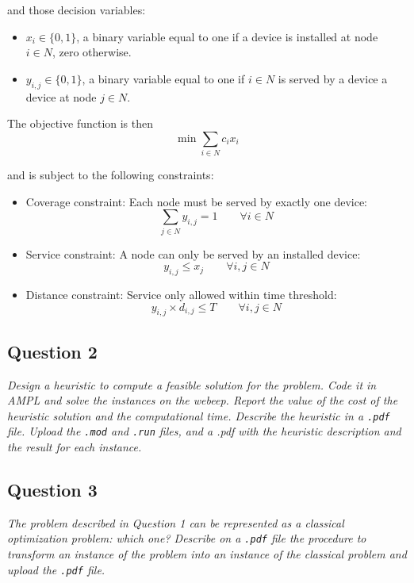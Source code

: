 \documentclass[10pt]{article}
\begin{document}
    and those decision variables:
    \begin{itemize}
        \item $x_i \in \{0,1\}$, a binary variable equal to one if a device is installed at node $i \in N$, zero otherwise.
        \item $y_{i,j} \in \{0,1\}$, a binary variable equal to one if $i \in N$ is served by a device a device at node $j \in N$.
    \end{itemize}

    The objective function is then
    \begin{equation}
        \min \sum_{i \in N} c_i x_i
    \end{equation}

    and is subject to the following constraints:
    \begin{itemize}
        \item Coverage constraint: Each node must be served by exactly one device:
        \[
            \sum_{j \in N} y_{i,j} = 1 \qquad \forall i \in N
        \]
        \item Service constraint: A node can only be served by an installed device:
        \[
            y_{i,j} \le x_j \qquad \forall i,j \in N
        \]
        \item Distance constraint: Service only allowed within time threshold:
        \[
            y_{i,j} \times d_{i,j} \le T \qquad \forall i,j \in N
        \]
    \end{itemize}








    \subsection*{Question 2}
    \textit{Design a heuristic to compute a feasible solution for the problem. Code it in AMPL and solve the instances on the webeep. Report the value of the cost of the heuristic solution and the computational time. Describe the heuristic in a \texttt{.pdf} file. Upload the \texttt{.mod} and \texttt{.run} files, and a .pdf with the heuristic description and the result for each instance.}

    \subsection*{Question 3}
    \textit{The problem described in Question 1 can be represented as a classical optimization problem: which one? Describe on a \texttt{.pdf} file the procedure to transform an instance of the problem into an instance of the classical problem and upload the \texttt{.pdf} file.}
\end{document}
